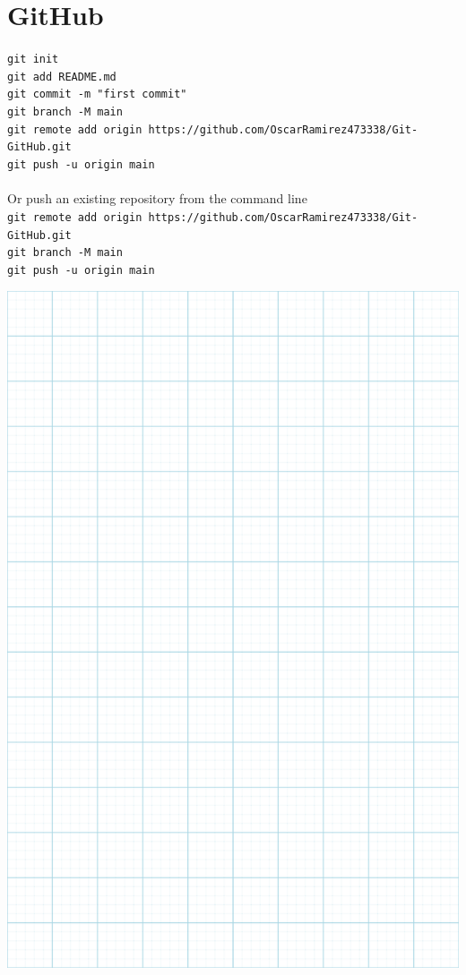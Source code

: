 \documentclass[10pt, a4paper,ngerman]{article}
\begin{document}
\section{GitHub}
\texttt{git init}\\
\texttt{git add README.md}\\
\texttt{git commit -m "first commit"}\\
\texttt{git branch -M main}\\
\texttt{git remote add origin https://github.com/OscarRamirez473338/Git-GitHub.git}\\
\texttt{git push -u origin main}\\\\
Or push an existing repository from the command line\\
\texttt{git remote add origin https://github.com/OscarRamirez473338/Git-GitHub.git}\\
\texttt{git branch -M main}\\
\texttt{git push -u origin main}\\
\newpage
\begin{center}
  \includegraphics[scale=0.62]{../pngeggmejorada.png}
\end{center}
\end{document}
